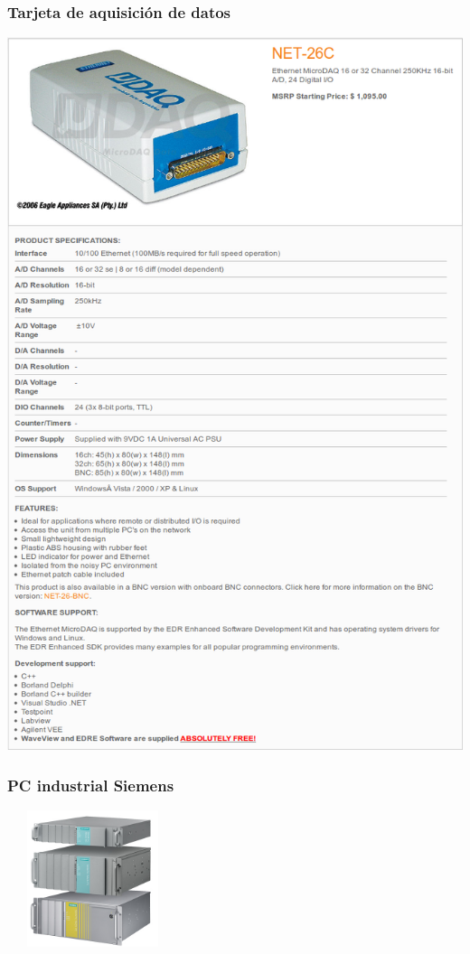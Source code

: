 \subsubsection{Tarjeta de aquisición de datos}
\hspace*{0cm}
\includegraphics[scale=0.63]{Datasheets/10Tarjeta.png}
\newpage
\subsubsection{PC industrial Siemens}
\hspace*{0cm}
\includegraphics[width=5cm,height=4cm,keepaspectratio]{Datasheets/12Foto.png} 

